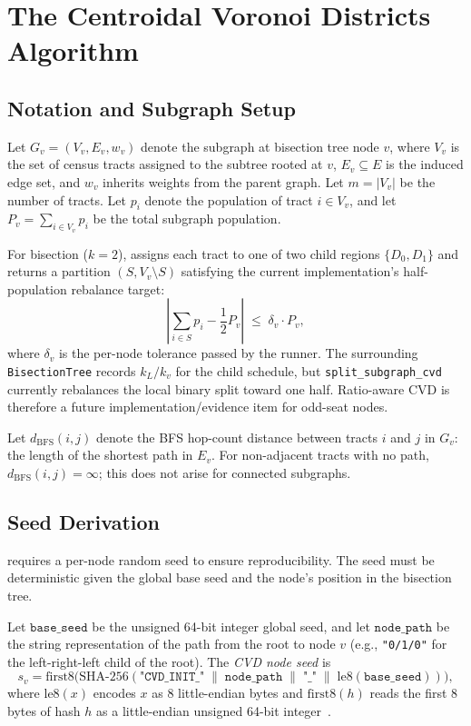 \section{The Centroidal Voronoi Districts Algorithm}
\label{sec:algorithm}

\subsection{Notation and Subgraph Setup}

Let $G_v = (V_v, E_v, w_v)$ denote the subgraph at bisection tree node $v$,
where $V_v$ is the set of census tracts assigned to the subtree rooted at $v$,
$E_v \subseteq E$ is the induced edge set, and $w_v$ inherits weights from the
parent graph.
Let $m = |V_v|$ be the number of tracts.
Let $p_i$ denote the population of tract $i \in V_v$, and let
$P_v = \sum_{i \in V_v} p_i$ be the total subgraph population.

For bisection ($k=2$), \cvd{} assigns each tract to one of two child regions
$\{D_0, D_1\}$ and returns a partition $(S, V_v \setminus S)$ satisfying
the current implementation's half-population rebalance target:
\[
  \left|\sum_{i \in S} p_i - \frac{1}{2} P_v \right|
  \;\le\;
  \delta_v \cdot P_v,
\]
where $\delta_v$ is the per-node tolerance passed by the runner.
The surrounding \texttt{BisectionTree} records $k_L/k_v$ for the child
schedule, but \texttt{split\_subgraph\_cvd} currently rebalances the local
binary split toward one half.
Ratio-aware CVD is therefore a future implementation/evidence item for
odd-seat nodes.

Let $d_{\mathrm{BFS}}(i, j)$ denote the BFS hop-count distance between
tracts $i$ and $j$ in $G_v$: the length of the shortest path in $E_v$.
For non-adjacent tracts with no path, $d_{\mathrm{BFS}}(i,j) = \infty$;
this does not arise for connected subgraphs.

\subsection{Seed Derivation}

\cvd{} requires a per-node random seed to ensure reproducibility.
The seed must be deterministic given the global base seed and the node's
position in the bisection tree.

\begin{definition}
\label{def:cvd-seed}
Let $\mathtt{base\_seed}$ be the unsigned 64-bit integer global seed, and let
$\mathtt{node\_path}$ be the string representation of the path from the root
to node $v$ (e.g., \texttt{"0/1/0"} for the left-right-left child of the root).
The \emph{CVD node seed} is
\[
  s_v = \mathrm{first8}\bigl(
    \mathrm{SHA\text{-}256}(
      \texttt{"CVD\_INIT\_"} \;\|\; \mathtt{node\_path}
      \;\|\; \texttt{"\_"} \;\|\; \mathrm{le8}(\mathtt{base\_seed})
    )
  \bigr),
\]
where $\mathrm{le8}(x)$ encodes $x$ as 8 little-endian bytes and
$\mathrm{first8}(h)$ reads the first 8 bytes of hash $h$ as a
little-endian unsigned 64-bit integer~\citep{sha256nist}.
\end{definition}

